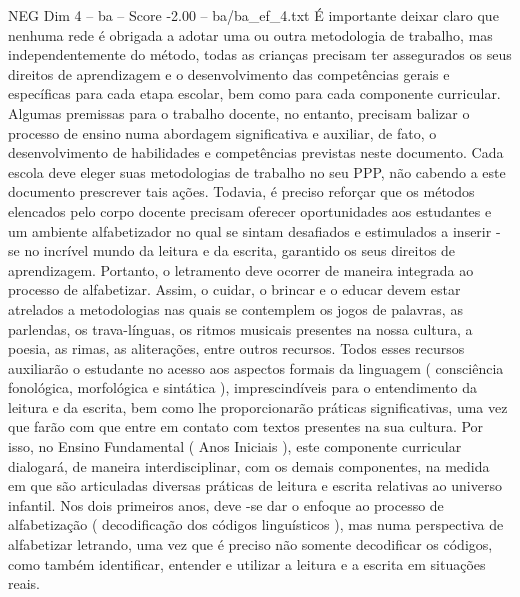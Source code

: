 \begin{textsample}{NEG Dim 4 – ba – Score -2.00 – ba/ba\_ef\_4.txt}
É importante deixar claro que nenhuma rede é obrigada a adotar uma ou outra metodologia de trabalho, mas independentemente do método, todas as crianças precisam ter assegurados os seus direitos de aprendizagem e o desenvolvimento das competências gerais e específicas para cada etapa escolar, bem como para cada componente curricular.
Algumas premissas para o trabalho docente, no entanto, precisam balizar o processo de ensino numa abordagem significativa e auxiliar, de fato, o desenvolvimento de habilidades e competências previstas neste documento.
Cada escola deve eleger suas metodologias de trabalho no seu PPP, não cabendo a este documento prescrever tais ações.
Todavia, é preciso reforçar que os métodos elencados pelo corpo docente precisam oferecer oportunidades aos estudantes e um ambiente alfabetizador no qual se sintam desafiados e estimulados a inserir -se no incrível mundo da leitura e da escrita, garantido os seus direitos de aprendizagem.
Portanto, o letramento deve ocorrer de maneira integrada ao processo de alfabetizar.
Assim, o cuidar, o brincar e o educar devem estar atrelados a metodologias nas quais se contemplem os jogos de palavras, as parlendas, os trava-línguas, os ritmos musicais presentes na nossa cultura, a poesia, as rimas, as aliterações, entre outros recursos.
Todos esses recursos auxiliarão o estudante no acesso aos aspectos formais da linguagem ( consciência fonológica, morfológica e sintática ), imprescindíveis para o entendimento da leitura e da escrita, bem como lhe proporcionarão práticas significativas, uma vez que farão com que entre em contato com textos presentes na sua cultura.
Por isso, no Ensino Fundamental ( Anos Iniciais ), este componente curricular dialogará, de maneira interdisciplinar, com os demais componentes, na medida em que são articuladas diversas práticas de leitura e escrita relativas ao universo infantil.
Nos dois primeiros anos, deve -se dar o enfoque ao processo de alfabetização ( decodificação dos códigos linguísticos ), mas numa perspectiva de alfabetizar letrando, uma vez que é preciso não somente decodificar os códigos, como também identificar, entender e utilizar a leitura e a escrita em situações reais.

\end{textsample}
